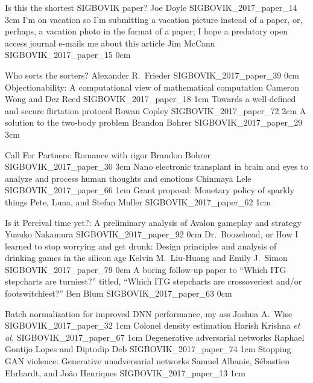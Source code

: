 

\addpaper
	{Is this the shortest SIGBOVIK paper?}
	{Joe Doyle}
	{}
	{SIGBOVIK_2017_paper_14}
	{3cm}
	{}
\addpaper
	{I'm on vacation so I'm submitting a vacation picture instead of a paper, or, perhaps, a vacation photo in the format of a paper; I hope a predatory open access journal e-mails me about this article}
	{Jim McCann}
	{}
	{SIGBOVIK_2017_paper_15}
	{0cm}
	{}

\addpaper
	{Who sorts the sorters?}
	{Alexander R.\ Frieder}
	{}
	{SIGBOVIK_2017_paper_39}
	{0cm}
	{}
\addpaper
	{Objectionability: A computational view of mathematical computation}
	{Cameron Wong and Dez Reed}
	{}
	{SIGBOVIK_2017_paper_18}
	{1cm}
	{}
\addpaper
	{Towards a well-defined and secure flirtation protocol}
	{Rowan Copley}
	{}
	{SIGBOVIK_2017_paper_72}
	{2cm}
	{}
\addpaper
	{A solution to the two-body problem}
	{Brandon Bohrer}
	{}
	{SIGBOVIK_2017_paper_29}
	{3cm}
	{}

\addpaper
	{Call For Partners: Romance with rigor}
	{Brandon Bohrer}
	{}
	{SIGBOVIK_2017_paper_30}
	{3cm}
	{}
\addpaper
	{Nano electronic transplant in brain and eyes to analyze and process human thoughts and emotions}
	{Chinmaya Lele}
	{}
	{SIGBOVIK_2017_paper_66}
	{1cm}
	{}
\addpaper
	{Grant proposal: Monetary policy of sparkly things}
	{Pete, Luna, and Stefan Muller}
	{}
	{SIGBOVIK_2017_paper_62}
	{1cm}
	{}

\addpaper
	{Is it Percival time yet?: A preliminary analysis of Avalon gameplay and strategy}
	{Yuzuko Nakamura}
	{}
	{SIGBOVIK_2017_paper_92}
	{0cm}
	{}
\addpaper
	{Dr.\ Boozehead, or How I learned to stop worrying and get drunk: Design principles and analysis of drinking games in the silicon age}
	{Kelvin M.\ Liu-Huang and Emily J.\ Simon}
	{}
	{SIGBOVIK_2017_paper_79}
	{0cm}
	{}
\addpaper
	{A boring follow-up paper to ``Which ITG stepcharts are turniest?'' titled, ``Which ITG stepcharts are crossoveriest and/or footswitchiest?''}
	{Ben Blum}
	{}
	{SIGBOVIK_2017_paper_63}
	{0cm}
	{}

\addpaper
	{Batch normalization for improved DNN performance, my ass}
	{Joshua A.\ Wise}
	{}
	{SIGBOVIK_2017_paper_32}
	{1cm}
	{}
\addpaper
	{Colonel density estimation}
	{Harish Krishna \textit{et al.}}
	{}
	{SIGBOVIK_2017_paper_67}
	{1cm}
	{}
\addpaper
	{Degenerative adversarial networks}
	{Raphael Gontijo Lopes and Diptodip Deb}
	{}
	{SIGBOVIK_2017_paper_74}
	{1cm}
	{}
\addpaper
	{Stopping GAN violence: Generative unadversarial networks}
	{Samuel Albanie, S\'ebastien Ehrhardt, and Jo\~ao Henriques}
	{}
	{SIGBOVIK_2017_paper_13}
	{1cm}
	{}

